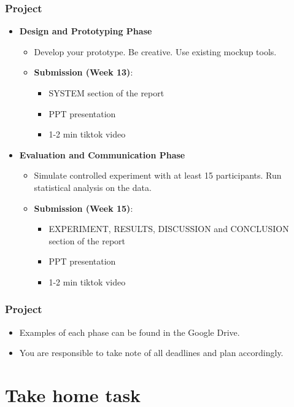 \documentclass{beamer}
\begin{document}
\begin{frame}
\frametitle{Project}
\footnotesize
\begin{itemize}
	\item \textbf{Design and Prototyping Phase}
	\begin{itemize}
		\item Develop your prototype.   Be creative.  Use existing mockup tools. 
		\item \textbf{Submission (Week 13)}:
		\begin{itemize}
			\item SYSTEM section of the report
			\item  PPT presentation
            \item 1-2 min tiktok video
		\end{itemize}
	\end{itemize}
	\item \textbf{Evaluation and Communication Phase}
	\begin{itemize}
		\item Simulate controlled experiment with at least 15 participants.  Run statistical analysis on the data.  
		\item \textbf{Submission (Week 15)}:
		\begin{itemize}
			\item  EXPERIMENT, RESULTS, DISCUSSION and CONCLUSION section of the report
			\item  PPT presentation
            \item 1-2 min tiktok video
		\end{itemize}
	\end{itemize}
\end{itemize}
\end{frame}

\begin{frame}
\frametitle{Project}
\begin{itemize}
	\item Examples of each phase can be found in the Google Drive.
	\item You are responsible to take note of all deadlines and plan accordingly.
\end{itemize}
\end{frame}

\section{Take home task}
\end{document}
